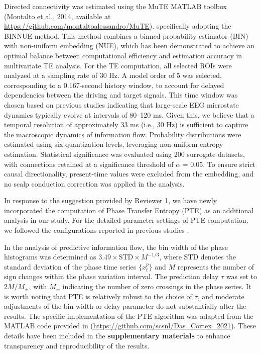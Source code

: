 \documentclass[lettersize,journal]{IEEEtran}
\begin{document}
Directed connectivity was estimated using the MuTE MATLAB toolbox (Montalto et al., 2014\cite{montalto2014mute}, available at \url{https://github.com/montaltoalessandro/MuTE}). specifically adopting the BINNUE method. This method combines a binned probability estimator (BIN) with non-uniform embedding (NUE), which has been demonstrated to achieve an optimal balance between computational efficiency and estimation accuracy in multivariate TE analysis. For the TE computation, all selected ROIs were analyzed at a sampling rate of 30 Hz. A model order of 5 was selected, corresponding to a 0.167-second history window, to account for delayed dependencies between the driving and target signals. This time window was chosen based on previous studies indicating that large-scale EEG microstate dynamics typically evolve at intervals of 80–120 ms\cite{khanna2015microstates}. Given this, we believe that a temporal resolution of approximately 33 ms (i.e., 30 Hz) is sufficient to capture the macroscopic dynamics of information flow. Probability distributions were estimated using six quantization levels, leveraging non-uniform entropy estimation. Statistical significance was evaluated using 200 surrogate datasets, with connections retained at a significance threshold of  $\alpha$ = 0.05. To ensure strict causal directionality, present-time values were excluded from the embedding, and no scalp conduction correction was applied in the analysis.

In response to the suggestion provided by Reviewer 1, we have newly incorporated the computation of Phase Transfer Entropy (PTE) as an additional analysis in our study. For the detailed parameter settings of PTE computation, we followed the configurations reported in previous studies \cite{das2020spatiotemporal, das2022electrophysiological, das2022replicable,das2022causal,das2024frequency}. 

In the analysis of predictive information flow, the bin width of the phase histograms was determined as $3.49 \times \mathrm{STD} \times M^{-1/3}$, where $\mathrm{STD}$ denotes the standard deviation of the phase time series $\{x_t^p\}$ and $M$ represents the number of sign changes within the phase variation interval. The prediction delay $\tau$ was set to $2M/M_\pm$, with $M_\pm$ indicating the number of zero crossings in the phase series. It is worth noting that PTE is relatively robust to the choice of $\tau$, and moderate adjustments of the bin width or delay parameter do not substantially alter the results. The specific implementation of the PTE algorithm was adapted from the MATLAB code provided in \cite{das2022causal} (\url{https://github.com/scsnl/Das_Cortex_2021}). These details have been included in the \textbf{supplementary materials} to enhance transparency and reproducibility of the results.
\end{document}
